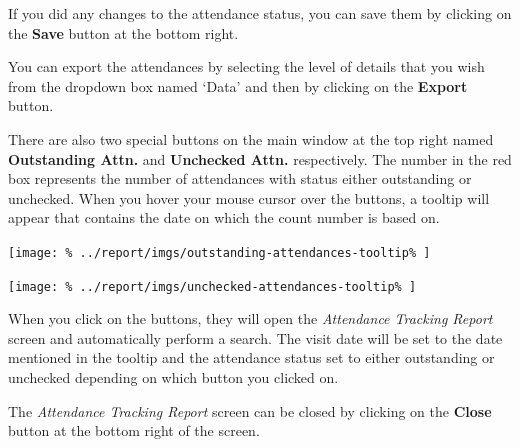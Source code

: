 \documentclass[../main/main]{subfiles}
\begin{document}
If you did any changes to the attendance status, you can save them by clicking
on the \textbf{Save} button at the bottom right.

You can export the attendances by selecting the level of details that you wish
from the dropdown box named `Data' and then by clicking on the \textbf{Export}
button.

There are also two special buttons on the main window at the top right named
\textbf{Outstanding Attn.} and \textbf{Unchecked Attn.} respectively. The
number in the red box represents the number of attendances with status either
outstanding or unchecked. When you hover your mouse cursor over the buttons,
a tooltip will appear that contains the date on which the count number is based
on.

\texttt{[image: \%
  ../report/imgs/outstanding-attendances-tooltip\%
]}

\texttt{[image: \%
  ../report/imgs/unchecked-attendances-tooltip\%
]}

When you click on the buttons, they will open the \emph{Attendance Tracking
Report} screen and automatically perform a search.
The visit date will be set to the date mentioned in the tooltip
and the attendance status set to either outstanding or unchecked depending
on which button you clicked on.

The \emph{Attendance Tracking Report} screen can be closed by clicking on the
\textbf{Close} button at the bottom right of the screen.
\end{document}
